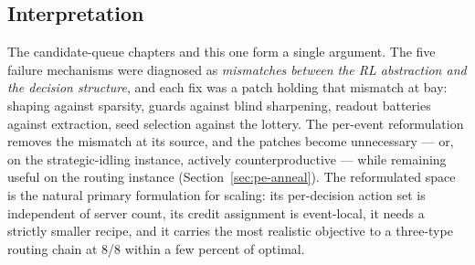 \documentclass[11pt,a4paper]{article}
\begin{document}
\subsection{Interpretation}

The candidate-queue chapters and this one form a single argument.  The
five failure mechanisms were diagnosed as \emph{mismatches between the
RL abstraction and the decision structure}, and each fix was a patch
holding that mismatch at bay: shaping against sparsity, guards against
blind sharpening, readout batteries against extraction, seed selection
against the lottery.  The per-event reformulation removes the mismatch
at its source, and the patches become unnecessary --- or, on the
strategic-idling instance, actively counterproductive --- while
remaining useful on the routing instance (Section~\ref{sec:pe-anneal}).
The reformulated space is the natural primary formulation for scaling:
its per-decision action set is independent of server count, its credit
assignment is event-local, it needs a strictly smaller recipe, and it
carries the most realistic objective to a three-type routing chain at
8/8 within a few percent of optimal.
\end{document}
